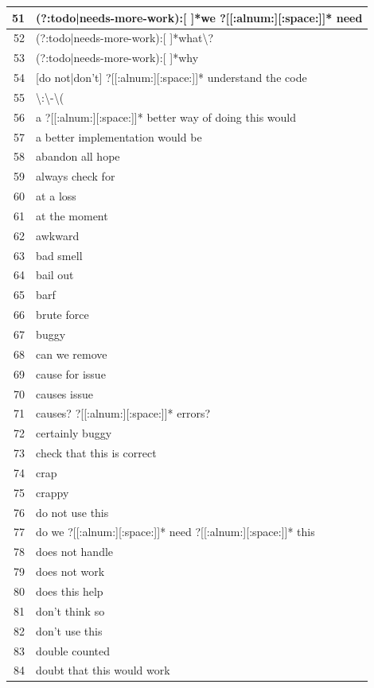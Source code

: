 \documentclass[
]{article}
\begin{document}
\begin{longtable}{r|l}
\hline
51 & (?:todo|needs-more-work):[ ]*we ?[[:alnum:][:space:]]* need\\
\hline
52 & (?:todo|needs-more-work):[ ]*what\textbackslash{}?\\
\hline
53 & (?:todo|needs-more-work):[ ]*why\\
\hline
54 & [do not|don't] ?[[:alnum:][:space:]]* understand the code\\
\hline
55 & \textbackslash{}:\textbackslash{}-\textbackslash{}(\\
\hline
56 & a ?[[:alnum:][:space:]]* better way of doing this would\\
\hline
57 & a better implementation would be\\
\hline
58 & abandon all hope\\
\hline
59 & always check for\\
\hline
60 & at a loss\\
\hline
61 & at the moment\\
\hline
62 & awkward\\
\hline
63 & bad smell\\
\hline
64 & bail out\\
\hline
65 & barf\\
\hline
66 & brute force\\
\hline
67 & buggy\\
\hline
68 & can we remove\\
\hline
69 & cause for issue\\
\hline
70 & causes issue\\
\hline
71 & causes? ?[[:alnum:][:space:]]* errors?\\
\hline
72 & certainly buggy\\
\hline
73 & check that this is correct\\
\hline
74 & crap\\
\hline
75 & crappy\\
\hline
76 & do not use this\\
\hline
77 & do we ?[[:alnum:][:space:]]* need ?[[:alnum:][:space:]]* this\\
\hline
78 & does not handle\\
\hline
79 & does not work\\
\hline
80 & does this help\\
\hline
81 & don't think so\\
\hline
82 & don't use this\\
\hline
83 & double counted\\
\hline
84 & doubt that this would work\\

\end{longtable}
\end{document}
